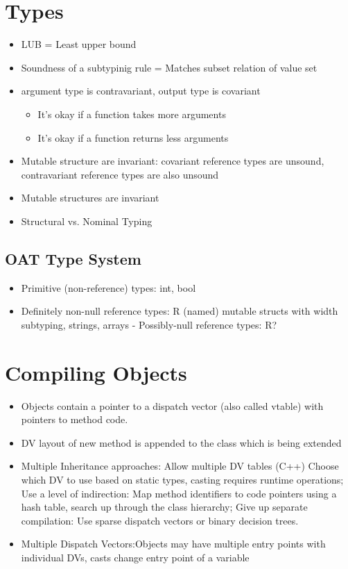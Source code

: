 \section*{Types}
\begin{itemize}
	\item LUB = Least upper bound
	\item Soundness of a subtypinig rule = Matches subset relation of value set
	\item argument type is contravariant, output type is covariant
	\begin{itemize}
		\item It's okay if a function takes more arguments
		\item It's okay if a function returns less arguments
	\end{itemize}
	\item Mutable structure are invariant: covariant reference types are unsound, contravariant reference types are also unsound
	\item Mutable structures are invariant
	\item Structural vs. Nominal Typing
\end{itemize}
\subsection*{OAT Type System}
\begin{itemize}
	\item Primitive (non-reference) types: int, bool
	\item Definitely non-null reference types: R (named) mutable structs with width subtyping, strings, arrays - Possibly-null reference types: R?
\end{itemize}
\section*{Compiling Objects}
\begin{itemize}
	\item Objects contain a pointer to a dispatch vector (also called vtable) with pointers to method code. 
	\item DV layout of new method is appended to the class which is being extended
	\item Multiple Inheritance approaches: Allow multiple DV tables (C++) Choose which DV to use based on static types, casting requires runtime operations; Use a level of indirection: Map method identifiers to code pointers using a hash table, search up through the class hierarchy; Give up separate compilation: Use sparse dispatch vectors or binary decision trees.
	\item Multiple Dispatch Vectors:Objects may have multiple entry points with individual DVs, casts change entry point of a variable
\end{itemize}


